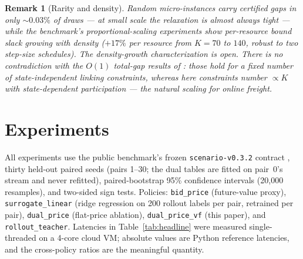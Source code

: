 \documentclass[11pt]{article}
\newtheorem{remark}{Remark}
\begin{document}
\begin{remark}[Rarity and density]
Random micro-instances carry certified gaps in only ${\sim}0.03\%$ of
draws --- at small scale the relaxation is almost always tight --- while
the benchmark's proportional-scaling experiments show per-resource bound
slack growing with density ($+17\%$ per resource from $K = 70$ to $140$,
robust to two step-size schedules). The density-growth characterization
is open. There is no contradiction with the $O(1)$ total-gap results of
\citet{brownzhang2023strength}: those hold for a fixed number of
state-independent linking constraints, whereas here constraints number
$\propto K$ with state-dependent participation --- the natural scaling
for online freight.
\end{remark}

\section{Experiments}
\label{sec:experiments}

All experiments use the public benchmark's frozen
\texttt{scenario-v0.3.2} contract
\citep{chandrasekaran2026freightbidbench}, thirty held-out paired seeds (pairs
1--30; the dual tables are fitted on pair~0's stream and never
refitted), paired-bootstrap 95\% confidence intervals (20{,}000
resamples), and two-sided sign tests. Policies: \texttt{bid\_price}
(future-value proxy), \texttt{surrogate\_linear} (ridge regression on
200 rollout labels per pair, retrained per pair), \texttt{dual\_price}
(flat-price ablation), \texttt{dual\_price\_vf} (this paper), and
\texttt{rollout\_teacher}. Latencies in Table~\ref{tab:headline} were
measured single-threaded on a 4-core cloud VM; absolute values are
Python reference latencies, and the cross-policy ratios are the
meaningful quantity.
\end{document}
